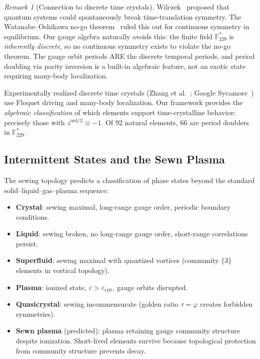 \documentclass[12pt,oneside]{article}
\theoremstyle{principia}
\theoremstyle{definition}
\theoremstyle{remark}
\newtheorem{remark}[theorem]{Remark}
\begin{document}
\begin{remark}[Connection to discrete time crystals]
Wilczek~\cite{wilczek2012} proposed that quantum systems could spontaneously break time-translation symmetry. The Watanabe--Oshikawa no-go theorem~\cite{watanabe2015} ruled this out for continuous symmetry in equilibrium. Our gauge algebra naturally avoids this: the finite field $\mathbb{F}_{229}^*$ is \emph{inherently discrete}, so no continuous symmetry exists to violate the no-go theorem. The gauge orbit periods ARE the discrete temporal periods, and period doubling via parity inversion is a built-in algebraic feature, not an exotic state requiring many-body localization.

Experimentally realized discrete time crystals (Zhang et al.~\cite{zhang2017}; Google Sycamore~\cite{mi2022}) use Floquet driving and many-body localization. Our framework provides the \emph{algebraic classification} of which elements support time-crystalline behavior: precisely those with $z^{\mathrm{ord}/2} \equiv -1$. Of 92 natural elements, 66 are period doublers in $\mathbb{F}_{229}^*$.
\end{remark}

\subsection{Intermittent States and the Sewn Plasma}

The sewing topology predicts a classification of phase states beyond the standard solid--liquid--gas--plasma sequence:

\begin{itemize}[noitemsep]
  \item \textbf{Crystal}: sewing maximal, long-range gauge order, periodic boundary conditions.
  \item \textbf{Liquid}: sewing broken, no long-range gauge order, short-range correlations persist.
  \item \textbf{Superfluid}: sewing maximal with quantized vortices (community $\{3\}$ elements in vortical topology).
  \item \textbf{Plasma}: ionized state, $\varepsilon > \varepsilon_\mathrm{crit}$, gauge orbits disrupted.
  \item \textbf{Quasicrystal}: sewing incommensurate (golden ratio $\tau = \varphi$ creates forbidden symmetries).
  \item \textbf{Sewn plasma} (predicted): plasma retaining gauge community structure despite ionization. Short-lived elements survive because topological protection from community structure prevents decay.
\end{itemize}
\end{document}
